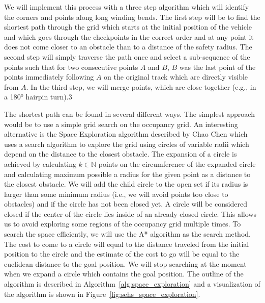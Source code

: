 
We will implement this process with a three step algorithm which will identify the corners and points along long winding bends. The first step will be to find the shortest path through the grid which starts at the initial position of the vehicle and which goes through the checkpoints in the correct order and at any point it does not come closer to an obstacle than to a distance of the safety radius. The second step will simply traverse the path once and select a sub-sequence of the points such that for two consecutive points $A$ and $B$, $B$ was the last point of the points immediately following $A$ on the original track which are directly visible from $A$. In the third step, we will merge points, which are close together (e.g., in a 180° hairpin turn).3

The shortest path can be found in several different ways. The simplest approach would be to use a simple grid search on the occupancy grid. An interesting alternative is the Space Exploration algorithm described by Chao Chen \cite{SEHS} which uses a search algorithm to explore the grid using circles of variable radii which depend on the distance to the closest obstacle. The expansion of a circle is achieved by calculating $k\in\mathbb{N}$ points on the circumference of the expanded circle and calculating maximum possible a radius for the given point as a distance to the closest obstacle. We will add the child circle to the open set if its radius is larger than some minimum radius (i.e., we will avoid points too close to obstacles) and if the circle has not been closed yet. A circle will be considered closed if the center of the circle lies inside of an already closed circle. This allows us to avoid exploring some regions of the occupancy grid multiple times. To search the space efficiently, we will use the A* algorithm as the search method. The cost to come to a circle will equal to the distance traveled from the initial position to the circle and the estimate of the cost to go will be equal to the euclidean distance to the goal position. We will stop searching at the moment when we expand a circle which contains the goal position. The outline of the algorithm is described in Algorithm~\ref{alg:space_exploration} and a visualization of the algorithm is shown in Figure~\ref{fig:sehs_space_exploration}.

